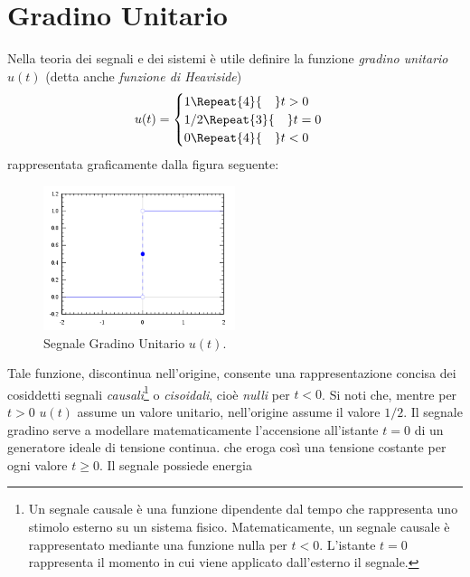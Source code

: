 \documentclass[12pt,oneside,openany]{memoir}
\numberwithin{equation}{subsection}
\newcommand{\quads}[1]{\Repeat{#1}{\quad}}
\begin{document}

\section{Gradino Unitario}
Nella teoria dei segnali e dei sistemi \`e utile definire la funzione
\textit{gradino unitario} $u(t)$ (detta anche \textit{funzione di Heaviside})
\begin{equation}
	u(t) =
		\begin{cases}
			1 \quads{4} t > 0\\
			1/2 \quads{3} t = 0\\
			0 \quads{4} t < 0
		\end{cases}
\end{equation}
rappresentata graficamente dalla figura seguente:
\begin{figure}[H]
	\centering
	\captionsetup{justification=centering}
	\includegraphics[width=0.5\textwidth]{images/heaviside_function.png}
	\caption{Segnale Gradino Unitario $u(t)$.}
\end{figure}
Tale funzione, discontinua nell'origine, consente una rappresentazione concisa
dei cosiddetti segnali \textit{causali}\footnote{Un segnale causale \`e una
funzione dipendente dal tempo che rappresenta uno stimolo esterno su un sistema
fisico. Matematicamente, un segnale causale \`e rappresentato mediante una
funzione nulla per $t < 0$. L'istante $t = 0$ rappresenta il momento in cui
viene applicato dall'esterno il segnale.} o \textit{cisoidali}, cio\`e
\textit{nulli} per $t < 0$. Si noti che, mentre per $t > 0$ $u(t)$ assume un
valore unitario, nell'origine assume il valore $1/2$.
\bigbreak
Il segnale gradino serve a modellare matematicamente l'accensione all'istante
$t = 0$ di un generatore ideale di tensione continua. che eroga cos\`i una
tensione costante per ogni valore $t \geq 0$. Il  segnale possiede energia
\end{document}
